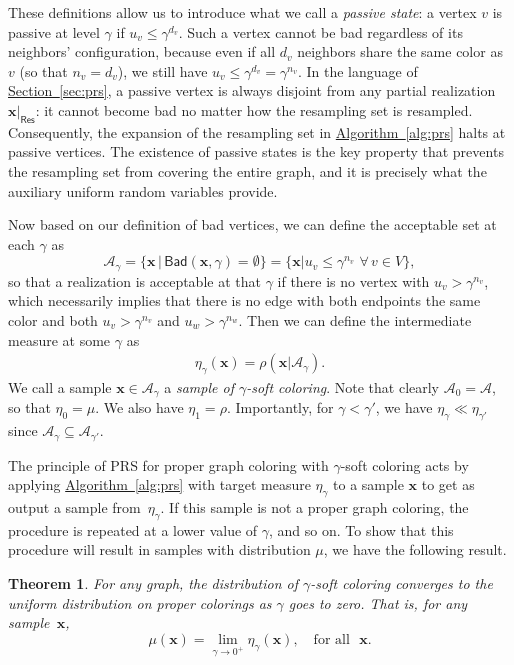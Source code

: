 \documentclass[12pt, a4paper]{article}
\theoremstyle{plain}
\newtheorem{theorem}{Theorem}
\theoremstyle{definition}
\theoremstyle{remark}
\newcommand{\mc}{\mathcal}
\renewcommand{\v}[1]{\boldsymbol{#1}}
\newcommand{\mx}{\v{x}}
\newcommand{\sref}[2]{\hyperref[#2]{#1~\ref*{#2}}}
\newcommand{\bad}{\mathsf{Bad}}
\newcommand{\res}{\mathsf{Res}}
\begin{document}
These definitions allow us to introduce what we call a {\em passive state}: a vertex \(v\) is passive at level \(\gamma\) if \(u_v\leq\gamma^{d_v}\). Such a vertex cannot be bad regardless of its neighbors' configuration, because even if all \(d_v\) neighbors share the same color as~\(v\) (so that \(n_v=d_v\)), we still have \(u_v\leq\gamma^{d_v}=\gamma^{n_v}\). In the language of \sref{Section}{sec:prs}, a passive vertex is always disjoint from any partial realization \(\mx|_{\res}\): it cannot become bad no matter how the resampling set is resampled. Consequently, the expansion of the resampling set in \sref{Algorithm}{alg:prs} halts at passive vertices. The existence of passive states is the key property that prevents the resampling set from covering the entire graph, and it is precisely what the auxiliary uniform random variables provide.

Now based on our definition of bad vertices, we can define the acceptable set at each \(\gamma\) as 
\[
\mc{A}_\gamma= \{\mx\, \big|\, \bad(\mx, \gamma) = \emptyset\}  = \{\mx\big|u_v\leq\gamma^{n_v}\,\, \forall\, v\in V \},
\] 
so that a realization is acceptable at that \(\gamma\) if there is no vertex with \(u_v>\gamma^{n_v}\), which necessarily implies that there is no edge with both endpoints the same color and both \(u_v>\gamma^{n_v}\) and \(u_w>\gamma^{n_w}\). Then we can define the intermediate measure at some \(\gamma\) as 
\begin{align}
\label{eqn:eta_defn}
    \eta_\gamma(\mx)=\rho(\mx|\mc{A}_\gamma).
\end{align} 
We call a sample \(\mx\in\mc{A}_\gamma\) a {\em sample of \(\gamma\)-soft coloring}. Note that clearly \(\mc{A}_0=\mc A\), so that \(\eta_0=\mu\). We also have \(\eta_1=\rho\). Importantly, for \(\gamma<\gamma'\), we have \(\eta_\gamma\ll\eta_{\gamma'}\) since $\mc{A}_{\gamma} \subseteq \mc{A}_{\gamma'}$.

The principle of PRS for proper graph coloring with \(\gamma\)-soft coloring acts by applying \sref{Algorithm}{alg:prs} with target measure \(\eta_\gamma\) to a sample \(\mx\) to get as output a sample from~\(\eta_\gamma\). If this sample is not a proper graph coloring, the procedure is repeated at a lower value of \(\gamma\), and so on.
To show that this procedure will result in samples with distribution \(\mu\), we have the following result.

\begin{theorem}
    \label{thm:conv-soft-coloring}
    For any graph, the distribution of $\gamma$-soft coloring converges to the uniform distribution on proper colorings as $\gamma$ goes to zero. That is, for any sample~\(\mx\), 
    \[
    \mu(\mx) = \lim_{\gamma \to 0^+} \eta_\gamma(\mx), \quad \text{for all }\, \, \mx.
    \]
\end{theorem}
\end{document}
